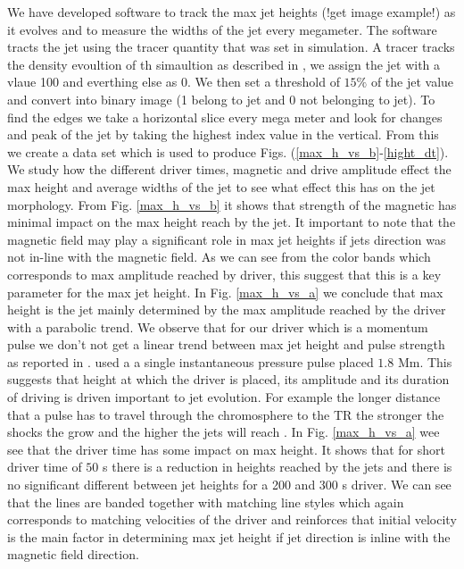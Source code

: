 \documentclass[12pt]{ociamthesis}
\newcommand{\fref}[1]{Fig. \eqref{#1}}
\begin{document}
\par We have developed software to track the max jet heights (!get image example!) as it evolves and to measure the widths of the jet every megameter. The software tracts the jet using the tracer quantity that was set in simulation. A tracer tracks the density evoultion of th simaultion as described in \cite{Porth_2014}, we assign the jet with a vlaue 100 and everthing else as 0. We then set a threshold of $15\%$ of the jet value and convert into binary image (1 belong to jet and 0 not belonging to jet). To find the edges we take a horizontal slice every mega meter and look for changes and peak of the jet by taking the highest index value in the vertical. From this we create a data set which is used to produce Figs. (\ref{max_h_vs_b}-\ref{hight_dt}). We study how the different driver times, magnetic and drive amplitude effect the max height and average widths of the jet to see what effect this has on the jet morphology. From \fref{max_h_vs_b} it shows that strength of the magnetic has minimal impact on the max height reach by the jet. It important to note that the magnetic field may play a significant role in max jet heights if jets direction was not in-line with the magnetic field. As we can see from the color bands which corresponds to max amplitude reached by driver, this suggest that this is a key parameter for the max jet height. In \fref{max_h_vs_a} we conclude that max height is the jet mainly determined by the max amplitude reached by the driver with a parabolic trend. We observe that for our driver which is a momentum pulse we don't not get a linear trend between max jet height and pulse strength as reported in \cite{Singh2019}. \cite{Singh2019} used a a single instantaneous pressure pulse placed $1.8$ Mm. This suggests that height at which the driver is placed, its amplitude and its duration of driving is driven important to jet evolution. For example the longer distance that a pulse has to travel through the chromosphere to the TR the stronger the shocks the grow and the higher the jets will reach \citep{Shibata1982}. In \fref{max_h_vs_a} wee see that the driver time has some impact on max height. It shows that for short driver time of $50$ s there is a reduction in heights reached by the jets and there is no significant different between jet heights for a 200 and 300 s driver. We can see that the lines are banded together with matching line styles which again corresponds to matching velocities of the driver and reinforces that initial velocity is the main factor in determining max jet height if jet direction is inline with the magnetic field direction.
\end{document}
